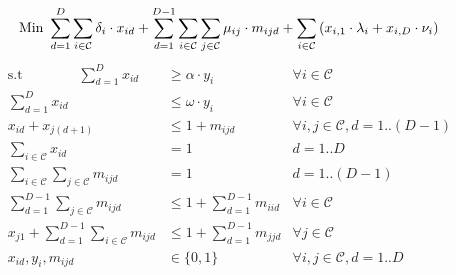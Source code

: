 \documentclass[12pt]{article}
\begin{document}
\begin{equation*}
\text{Min } \sum_{d=1}^{D} \sum_{i \in \mathcal{C}} \delta_{i} \cdot x_{id} + \sum_{d=1}^{D-1} \sum_{i \in \mathcal{C}} \sum_{j \in \mathcal{C}} \mu_{ij} \cdot m_{ijd} + \sum_{i \in \mathcal{C}} \left( x_{i,1} \cdot \lambda_{i} + x_{i,D} \cdot \nu_{i} \right)\\
\end{equation*}
\begin{align}
\text{s.t ~~~~~~~~~~~}
\sum_{d=1}^{D} x_{id} & \geq \alpha \cdot y_{i} & \forall i \in \mathcal{C} \label{BM:minDays}\\
\sum_{d=1}^{D} x_{id} & \leq \omega \cdot y_{i} &  \forall i \in \mathcal{C} \label{BM:maxDays}\\
x_{id} + x_{j(d+1)} & \leq 1 + m_{ijd} & \forall i,j \in \mathcal{C}, d = 1..(D-1) \label{BM:move}\\
\sum_{i \in \mathcal{C}} x_{id} &= 1 & d = 1..D \label{BM:city} \\
\sum_{i \in \mathcal{C}} \sum_{j \in \mathcal{C}} m_{ijd} &= 1 & d = 1..(D-1) \label{BM:moveOnce}\\
\sum_{d=1}^{D-1} \sum_{j \in \mathcal{C}} m_{ijd} &\leq 1 + \sum_{d=1}^{D-1} m_{iid} & \forall i \in \mathcal{C} \label{BM:leaveOnce}\\
x_{j1} + \sum_{d=1}^{D-1} \sum_{i \in \mathcal{C}} m_{ijd} &\leq 1 + \sum_{d=1}^{D-1} m_{jjd} & \forall j \in \mathcal{C}\label{BM:arriveOnce}\\
x_{id}, y_{i}, m_{ijd} & \in \{0,1\} & \forall i, j \in \mathcal{C}, d = 1..D \label{BM:8}
\end{align}
\end{document}
